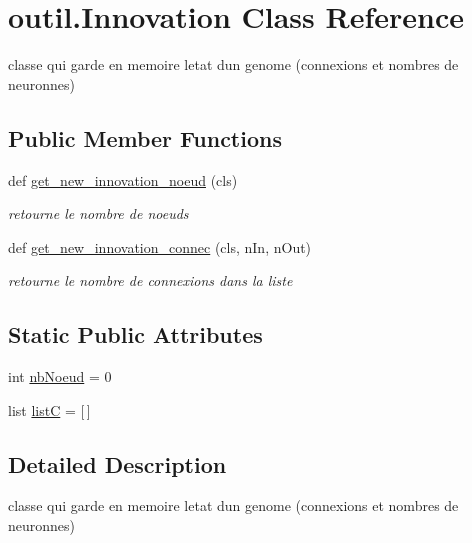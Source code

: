 \hypertarget{classoutil_1_1_innovation}{}\section{outil.\+Innovation Class Reference}
\label{classoutil_1_1_innovation}


classe qui garde en memoire l\textquotesingle{}etat d\textquotesingle{}un genome (connexions et nombres de neuronnes)  


\subsection*{Public Member Functions}
\begin{DoxyCompactItemize}
\item 
def \hyperlink{classoutil_1_1_innovation_aea3b763593cf4d9bd624dfb146ee5518}{get\+\_\+new\+\_\+innovation\+\_\+noeud} (cls)
\begin{DoxyCompactList}\small\item\em retourne le nombre de noeuds \end{DoxyCompactList}\item 
def \hyperlink{classoutil_1_1_innovation_aa809298251ae955d0ce51796714e4750}{get\+\_\+new\+\_\+innovation\+\_\+connec} (cls, n\+In, n\+Out)
\begin{DoxyCompactList}\small\item\em retourne le nombre de connexions dans la liste \end{DoxyCompactList}\end{DoxyCompactItemize}
\subsection*{Static Public Attributes}
\begin{DoxyCompactItemize}
\item 
int \hyperlink{classoutil_1_1_innovation_a51c71af8c3246b01cff5c2140ca8b7ba}{nb\+Noeud} = 0
\item 
list \hyperlink{classoutil_1_1_innovation_adbf19c50b8c62928eaf5c364cad9afba}{listC} = \mbox{[}$\,$\mbox{]}
\end{DoxyCompactItemize}


\subsection{Detailed Description}
classe qui garde en memoire l\textquotesingle{}etat d\textquotesingle{}un genome (connexions et nombres de neuronnes) 

